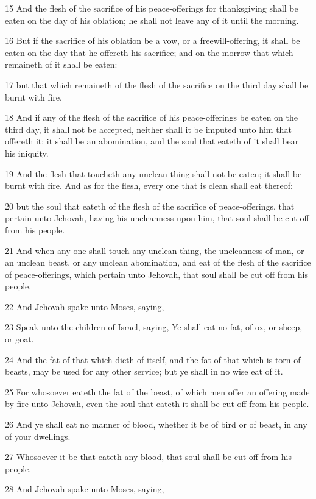 \par 15 And the flesh of the sacrifice of his peace-offerings for thanksgiving shall be eaten on the day of his oblation; he shall not leave any of it until the morning.
\par 16 But if the sacrifice of his oblation be a vow, or a freewill-offering, it shall be eaten on the day that he offereth his sacrifice; and on the morrow that which remaineth of it shall be eaten:
\par 17 but that which remaineth of the flesh of the sacrifice on the third day shall be burnt with fire.
\par 18 And if any of the flesh of the sacrifice of his peace-offerings be eaten on the third day, it shall not be accepted, neither shall it be imputed unto him that offereth it: it shall be an abomination, and the soul that eateth of it shall bear his iniquity.
\par 19 And the flesh that toucheth any unclean thing shall not be eaten; it shall be burnt with fire. And as for the flesh, every one that is clean shall eat thereof:
\par 20 but the soul that eateth of the flesh of the sacrifice of peace-offerings, that pertain unto Jehovah, having his uncleanness upon him, that soul shall be cut off from his people.
\par 21 And when any one shall touch any unclean thing, the uncleanness of man, or an unclean beast, or any unclean abomination, and eat of the flesh of the sacrifice of peace-offerings, which pertain unto Jehovah, that soul shall be cut off from his people.
\par 22 And Jehovah spake unto Moses, saying,
\par 23 Speak unto the children of Israel, saying, Ye shall eat no fat, of ox, or sheep, or goat.
\par 24 And the fat of that which dieth of itself, and the fat of that which is torn of beasts, may be used for any other service; but ye shall in no wise eat of it.
\par 25 For whosoever eateth the fat of the beast, of which men offer an offering made by fire unto Jehovah, even the soul that eateth it shall be cut off from his people.
\par 26 And ye shall eat no manner of blood, whether it be of bird or of beast, in any of your dwellings.
\par 27 Whosoever it be that eateth any blood, that soul shall be cut off from his people.
\par 28 And Jehovah spake unto Moses, saying,
